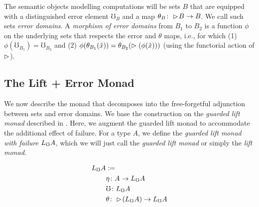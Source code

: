 The semantic objects modelling computations will be sets $B$ that are
equipped with a distinguished error element $\mho_B$ and a map $\theta_B \colon
\vartriangleright \hspace{-0.2em} B \to B$. We call such sets \emph{error domains}. A \emph{morphism of
error domains} from $B_1$ to $B_2$ is a function $\phi$ on the underlying sets
that respects the error and $\theta$ maps, i.e., for which 
%
(1) $\phi(\mho_{B_1}) = \mho_{B_2}$ and
%
(2) $\phi(\theta_{B_1}(\tilde{x})) = \theta_{B_2}(\vartriangleright (\phi(\tilde{x})))$
(using the functorial action of $\vartriangleright$).

\subsection{The Lift + Error Monad}\label{sec:lift-monad}



We now describe the monad that decomposes into the free-forgetful adjunction
between sets and error domains. We base the construction on the \emph{guarded
lift monad} described in \cite{mogelberg-paviotti2016}. Here, we augment the
guarded lift monad to accommodate the additional effect of failure. For a type
$A$, we define the \emph{guarded lift monad with failure} $L_\mho A$, which we will
just call the \emph{guarded lift monad} or simply the \emph{lift monad}.

\begin{align*}
  L_\mho A &:= \\
  &\eta \colon A \to L_\mho A \\
  &\mho \colon L_\mho A \\
  &\theta \colon \vartriangleright \hspace{-0.2em} (L_\mho A) \to L_\mho A
\end{align*}

